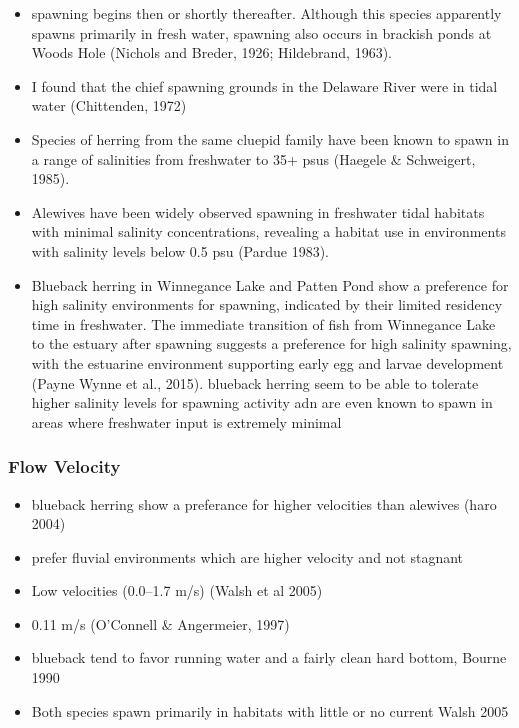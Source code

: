 \documentclass[
]{book}
\providecommand{\tightlist}{%
  \setlength{\itemsep}{0pt}\setlength{\parskip}{0pt}}
\begin{document}
\begin{itemize}
\item
  spawning begins then or shortly thereafter. Although this species apparently spawns primarily in fresh water, spawning also occurs in brackish ponds at Woods Hole (Nichols and Breder, 1926; Hildebrand, 1963).
\item
  I found that the chief spawning grounds in the Delaware River were in tidal water (Chittenden, 1972)
\item
  Species of herring from the same cluepid family have been known to spawn in a range of salinities from freshwater to 35+ psus (Haegele \& Schweigert, 1985).
\item
  Alewives have been widely observed spawning in freshwater tidal habitats with minimal salinity concentrations, revealing a habitat use in environments with salinity levels below 0.5 psu (Pardue 1983).
\item
  Blueback herring in Winnegance Lake and Patten Pond show a preference for high salinity environments for spawning, indicated by their limited residency time in freshwater. The immediate transition of fish from Winnegance Lake to the estuary after spawning suggests a preference for high salinity spawning, with the estuarine environment supporting early egg and larvae development (Payne Wynne et al., 2015). blueback herring seem to be able to tolerate higher salinity levels for spawning activity adn are even known to spawn in areas where freshwater input is extremely minimal
\end{itemize}

\hypertarget{flow-velocity-3}{%
\subsubsection{Flow Velocity}\label{flow-velocity-3}}

\begin{itemize}
\tightlist
\item
  blueback herring show a preferance for higher velocities than alewives (haro 2004)
\item
  prefer fluvial environments which are higher velocity and not stagnant
\item
  Low velocities (0.0--1.7 m/s) (Walsh et al 2005)
\item
  0.11 m/s (O'Connell \& Angermeier, 1997)
\item
  blueback tend to favor running water and a fairly clean hard bottom, Bourne 1990
\item
  Both species spawn primarily in habitats with little or no current Walsh 2005
\end{itemize}
\end{document}
